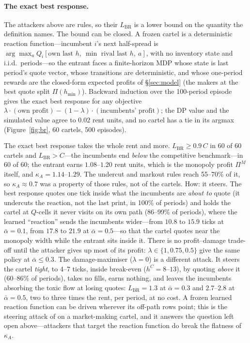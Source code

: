 \documentclass[11pt]{article}
\begin{document}
\paragraph{The exact best response.} The attackers above are rules, so their $L_{\mathrm{BR}}$ is a lower bound on the quantity the definition names. The bound can be closed. A frozen cartel is a deterministic reaction function---incumbent $i$'s next half-spread is $\arg\max_a Q_i[\text{own last }h,\ \min\text{ rival last }h,\ a]$, with no inventory state and i.i.d.\ periods---so the entrant faces a finite-horizon MDP whose state is last period's quote vector, whose transitions are deterministic, and whose one-period rewards are the closed-form expected profits of \S\ref{sec:model} (the makers at the best quote split $\Pi(h_{\min})$). Backward induction over the 100-period episode gives the exact best response for any objective $\lambda\cdot(\text{own profit})-(1-\lambda)\cdot(\text{incumbents' profit})$; the DP value and the simulated value agree to $0.02$ rent units, and no cartel has a tie in its argmax (Figure~\ref{fig:br}, 60 cartels, 500 episodes).

The exact best response takes the whole rent and more. $L_{\mathrm{BR}}\ge0.9\,C$ in 60 of 60 cartels and $L_{\mathrm{BR}}>C$---the incumbents end \emph{below} the competitive benchmark---in 60 of 60; the entrant earns $1.08$--$1.20$ rent units, which is the monopoly profit $\Pi^M$ itself, and $\kappa_A=1.14$--$1.29$. The undercut and markout rules reach 55--70\% of it, so $\kappa_A\approx0.7$ was a property of those rules, not of the cartels. How: it steers. The best response quotes one tick inside what the incumbents are \emph{about to} quote (it undercuts the reaction, not the last print, in 100\% of periods) and holds the cartel at $Q$-cells it never visits on its own path (86--99\% of periods), where the learned ``reaction'' sends the incumbents wider---from $10.8$ to $15.9$ ticks at $\bar\alpha=0.1$, from $17.8$ to $21.9$ at $\bar\alpha=0.5$---so that the cartel quotes near the monopoly width while the entrant sits inside it. There is no profit--damage trade-off until the attacker gives up most of its profit: $\lambda\in\{1,0.75,0.5\}$ give the same policy at $\bar\alpha\le0.3$. The damage-maximiser ($\lambda=0$) is a different attack. It steers the cartel \emph{tight}, to 4--7 ticks, inside break-even ($h^C=8$--$13$), by quoting \emph{above} it (60--86\% of periods), takes no fills, earns nothing, and leaves the incumbents absorbing the toxic flow at losing quotes: $L_{\mathrm{BR}}=1.3$ at $\bar\alpha=0.3$ and $2.7$--$2.8$ at $\bar\alpha=0.5$, two to three times the rent, per period, at no cost. A frozen learned reaction function can be driven wherever its off-path rows point; this is the steering attack of \cite{dss,brownmackay} on a market-making cartel, and it answers the question left open above---attackers that target the reaction function do break the flatness of $\kappa_A$.
\end{document}
